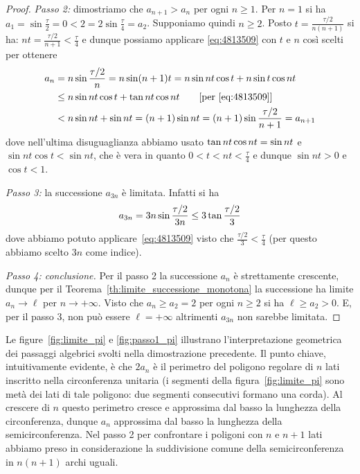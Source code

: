 \begin{proof}
\emph{Passo 2:}
dimostriamo che $a_{n+1} > a_n$ per ogni $n\ge 1$.
Per $n=1$ si ha $a_1 = \sin \frac \tau 2 = 0 < 2 = 2\sin\frac \tau 4 = a_2$.
Supponiamo quindi $n\ge 2$.
Posto $t = \frac{\tau / 2}{n(n+1)}$ si ha:
$nt = \frac {\tau / 2} {n+1} < \frac \tau 4$
e dunque possiamo applicare \eqref{eq:4813509} 
con $t$ e $n$ così scelti per ottenere
\begin{align*}
  a_n &= n \sin\frac{\tau / 2}{n} 
    = n \sin (n+1) t
    = n \sin nt \cos t + n \sin t \cos nt\\
    &\le n \sin nt \cos t + \operatorname{tan} nt \cos nt
    \qquad\text{[per \eqref{eq:4813509}]}\\
    &< n \sin nt + \sin nt
    = (n+1) \sin nt = (n+1) \sin \frac{\tau / 2}{n+1} = a_{n+1}
\end{align*}
dove nell'ultima disuguaglianza abbiamo usato 
$\operatorname{tan} nt \cos nt = \sin nt$ e
$\sin nt \cos t < \sin nt$, che è vera in quanto
$0 < t < nt < \frac \tau 4$ e dunque $\sin nt > 0$ e $\cos t < 1$.

\emph{Passo 3:}
la successione $a_{3n}$ è limitata.
Infatti si ha
\begin{align*}
 a_{3n} = 3n \sin \frac {\tau / 2} {3n} 
 \le 3\operatorname{tan} \frac {\tau / 2} 3
\end{align*}
dove abbiamo potuto applicare~\eqref{eq:4813509}
visto che $\frac {\tau / 2} 3 < \frac{\tau }{4}$
(per questo abbiamo scelto $3n$ come indice).

\emph{Passo 4: conclusione.}
Per il passo 2 la successione $a_n$ è strettamente crescente,
dunque per il Teorema~\ref{th:limite_successione_monotona} la successione 
ha limite $a_n\to \ell$ per $n\to +\infty$.
Visto che $a_n \ge a_2 = 2$ per ogni $n\ge 2$ si ha $\ell \ge a_2 >0$.
E, per il passo 3, non può essere $\ell=+\infty$ altrimenti $a_{3n}$ 
non sarebbe limitata.
\end{proof}

Le figure~\ref{fig:limite_pi} e \ref{fig:passo1_pi} illustrano l'interpretazione geometrica 
dei passaggi algebrici svolti nella dimostrazione precedente.
Il punto chiave, intuitivamente evidente, è che $2a_n$ è il perimetro 
del poligono regolare di $n$ lati inscritto nella circonferenza unitaria
(i segmenti della figura~\ref{fig:limite_pi} sono metà dei lati di tale poligono:
due segmenti consecutivi formano una corda).
Al crescere di $n$ questo perimetro cresce e approssima dal basso 
la lunghezza della circonferenza, 
dunque $a_n$ approssima dal basso la lunghezza della semicirconferenza.
Nel passo 2 per confrontare i poligoni con $n$ e $n+1$ lati 
abbiamo preso in considerazione la suddivisione comune 
della semicirconferenza in $n(n+1)$ archi uguali.

